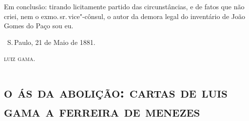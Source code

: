 Em conclusão: tirando licitamente partido das circunstâncias, e de fatos
que não criei, nem o exmo.\,sr.\,vice"-cônsul, o autor da demora legal do
inventário de João Gomes do Paço sou eu.

\vfill

\hfill\ S.\,Paulo, 21 de Maio de 1881.\smallskip

\hfill\textsc{luiz gama.}

\begingroup\makeatletter\@openrightfalse
\part[O ás da abolição: cartas de Gama a F.\,Menezes]{\textsc{o ás da abolição: cartas de luis\\ gama a ferreira de menezes}}

\pagebreak
\mbox{}\vfill
\thispagestyle{empty}

